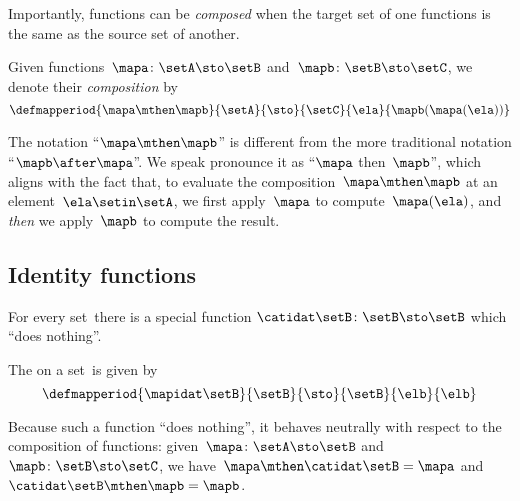 Importantly, functions can be \emph{composed} when the target set of one functions is the same as the source set of another.
\begin{ctdefinition}
    \label{def:composition-of-functions}
    Given functions~$\mapa\colon \setA \sto \setB$ and~$\mapb \colon \setB \sto \setC$, we denote their \emph{composition} by
    \begin{equation}
        \label{eq:composition-notation-functions}
        \defmapperiod{
            \mapa \mthen \mapb
        }{
            \setA
        }{
            \sto
        }{
            \setC
        }{
            \ela
        }{
            \mapb(\mapa(\ela))
        }
    \end{equation}
\end{ctdefinition}

The notation ``$\mapa \mthen \mapb$'' is different from the more traditional notation ``$\mapb \after \mapa$''.
We speak pronounce it as ``$\mapa$ then~$\mapb$'', which aligns with the fact that, to evaluate the composition~$\mapa \mthen \mapb$ at an element~$\ela \setin\setA$, we first apply~$\mapa$ to compute~$\mapa(\ela)$, and \emph{then} we apply~$\mapb$ to compute the result.

\subsection{Identity functions}

For every set~\setB there is a special function $\catidat\setB \colon \setB \sto \setB$ which ``does nothing''.
\begin{ctdefinition}\label{def:identity-function}
    The  on a set~\setB is given by
    \begin{equation}
        \defmapperiod{
            \mapidat\setB
        }{
            \setB
        }{
            \sto
        }{
            \setB
        }{
            \elb
        }{
            \elb
        }
    \end{equation}
\end{ctdefinition}
Because such a function ``does nothing'', it behaves neutrally with respect to the composition of functions: given~$\mapa \colon \setA \sto \setB$ and~$\mapb \colon \setB \sto \setC$, we have~$\mapa \mthen \catidat\setB = \mapa$ and~$\catidat\setB \mthen \mapb = \mapb$.

